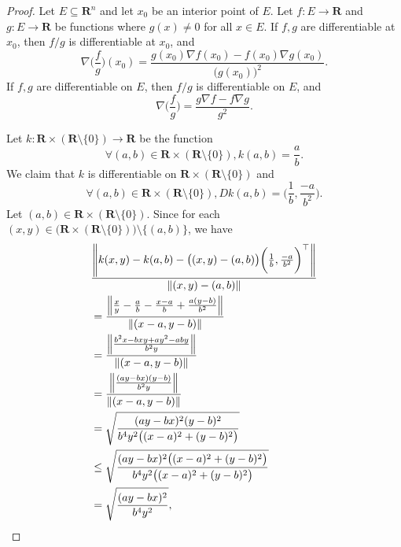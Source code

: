 \begin{proof}
    Let \(E \subseteq \mathbf{R}^n\) and let \(x_0\) be an interior point of \(E\).
    Let \(f : E \to \mathbf{R}\) and \(g : E \to \mathbf{R}\) be functions where \(g(x) \neq 0\) for all \(x \in E\).
    If \(f, g\) are differentiable at \(x_0\), then \(f / g\) is differentiable at \(x_0\), and
    \[
        \nabla \bigg(\frac{f}{g}\bigg)(x_0) = \frac{g(x_0) \nabla f(x_0) - f(x_0) \nabla g(x_0)}{\big(g(x_0)\big)^2}.
    \]
    If \(f, g\) are differentiable on \(E\), then \(f / g\) is differentiable on \(E\), and
    \[
        \nabla \bigg(\frac{f}{g}\bigg) = \frac{g \nabla f - f \nabla g}{g^2}.
    \]

    Let \(k : \mathbf{R} \times (\mathbf{R} \setminus \{0\}) \to \mathbf{R}\) be the function
    \[
        \forall (a, b) \in \mathbf{R} \times (\mathbf{R} \setminus \{0\}), k(a, b) = \frac{a}{b}.
    \]
    We claim that \(k\) is differentiable on \(\mathbf{R} \times (\mathbf{R} \setminus \{0\})\) and
    \[
        \forall (a, b) \in \mathbf{R} \times (\mathbf{R} \setminus \{0\}), D k(a, b) = \bigg(\frac{1}{b}, \frac{-a}{b^2}\bigg).
    \]
    Let \((a, b) \in \mathbf{R} \times (\mathbf{R} \setminus \{0\})\).
    Since for each \((x, y) \in \big(\mathbf{R} \times (\mathbf{R} \setminus \{0\})\big) \setminus \{(a, b)\}\), we have
    \begin{align*}
         & \frac{\norm*{k(x, y) - k(a, b) - \big((x, y) - (a, b)\big) \bigg(\frac{1}{b}, \frac{-a}{b^2}\bigg)^\top}}{\norm*{(x, y) - (a, b)}} \\
         & = \frac{\norm*{\frac{x}{y} - \frac{a}{b} - \frac{x - a}{b} + \frac{a(y - b)}{b^2}}}{\norm*{(x - a, y - b)}}                        \\
         & = \frac{\norm*{\frac{b^2 x - bxy + ay^2 - aby}{b^2y}}}{\norm*{(x - a, y - b)}}                                                     \\
         & = \frac{\norm*{\frac{(ay - bx)(y - b)}{b^2y}}}{\norm*{(x - a, y - b)}}                                                             \\
         & = \sqrt{\frac{(ay - bx)^2 (y - b)^2}{b^4 y^2 \big((x - a)^2 + (y - b)^2\big)}}                                                     \\
         & \leq \sqrt{\frac{(ay - bx)^2 \big((x - a)^2 + (y - b)^2\big)}{b^4 y^2 \big((x - a)^2 + (y - b)^2\big)}}                            \\
         & = \sqrt{\frac{(ay - bx)^2}{b^4 y^2}},
    \end{align*}

\end{proof}
